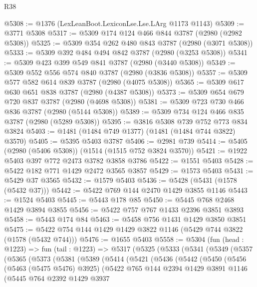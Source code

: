 \begin{lexlean}{R38}
\begin{coremodule}
@5308 := @1376 (LexLeanBoot.LexiconLse.Lse.LArg @1173 @1143)
@5309 := @3771 @5308
@5317 := @5309 @174 @124 @466 @844 @3787 (@2980 (@2982 @5308))
@5325 := @5309 @354 @262 @480 @843 @3787 (@2980 (@3071 @5308))
@5333 := @5309 @392 @484 @494 @842 @3787 (@2980 (@3253 @5308))
@5341 := @5309 @423 @399 @549 @841 @3787 (@2980 (@3440 @5308))
@5349 := @5309 @552 @556 @574 @840 @3787 (@2980 (@3836 @5308))
@5357 := @5309 @577 @582 @614 @839 @3787 (@2980 (@4075 @5308))
@5365 := @5309 @617 @630 @651 @838 @3787 (@2980 (@4387 @5308))
@5373 := @5309 @654 @679 @720 @837 @3787 (@2980 (@4698 @5308))
@5381 := @5309 @723 @730 @466 @836 @3787 (@2980 (@5144 @5308))
@5389 := @5309 @734 @124 @466 @835 @3787 (@2980 (@5289 @5308))
@5395 := @3816 @5308 @739 @752 @773 @834 @3824
@5403 := @1481 (@1484 @749 @1377) (@1481 (@1484 @744 @3822) @3570)
@5405 := @5395 @5403 @3787
@5406 := @2981 @739
@5414 := @5405 (@2980 (@5406 @5308)) (@1514 (@1515 @752 @3824 @3570))
@5421 := @1922 @5403 @397 @772 @2473 @3782 @3858 @3786
@5422 := @1551 @5403
@5428 := @5422 @182 @771 @1429 @2472 @3565 @3857
@5429 := @1573 @5403
@5431 := @5429 @37 @3565
@5432 := @1579 @5403
@5436 := @5428 (@5431 (@1578 (@5432 @37)))
@5442 := @5422 @769 @144 @2470 @1429 @3855 @1146
@5443 := @1524 @5403
@5445 := @5443 @178 @85
@5450 := @5445 @768 @2468 @1429 @3894 @3855
@5456 := @5422 @757 @767 @1433 @2396 @3851 @3893
@5458 := @5443 @174 @84
@5463 := @5458 @756 @1431 @1429 @3850 @3851
@5475 := @5422 @754 @144 @1429 @1429 @3822 @1146 (@5429 @744 @3822 (@1578 (@5432 @744)))
@5476 := @1655 @5403
@5558 := @5304
    (fun (head : @1223) =>
    fun (tail : @1223) =>
    @5317
      (@5325
        (@5333
          (@5341
            (@5349
              (@5357
                (@5365
                  (@5373
                    (@5381
                      (@5389
                        (@5414
                          (@5421
                            (@5436
                              (@5442
                                (@5450
                                  (@5456
                                    (@5463 (@5475 @5476) @3925)
                                    (@5422
                                      @765
                                      @144
                                      @2394
                                      @1429
                                      @3891
                                      @1146
                                      (@5445
                                        @764
                                        @2392
                                        @1429
                                        @3937

\end{coremodule}
\end{lexlean}
